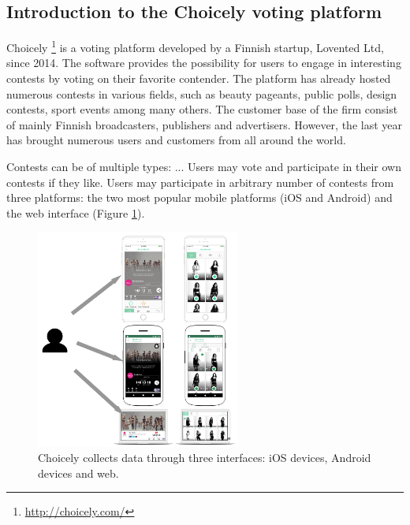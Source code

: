 \subsection{Introduction to the Choicely voting platform}
    Choicely \footnote{\url{http://choicely.com/}} is a voting platform developed by a Finnish startup, Lovented Ltd, since 2014. The software provides the possibility for users to engage in interesting contests by voting on their favorite contender. The platform has already hosted numerous contests in various fields, such as beauty pageants, public polls, design contests, sport events among many others. The customer base of the firm consist of mainly Finnish broadcasters, publishers and advertisers. However, the last year has brought numerous users and customers from all around the world.
    
    Contests can be of multiple types: ... %
    Users may vote and participate in their own contests if they like. Users may participate in arbitrary number of contests from three platforms: the two most popular mobile platforms (iOS and Android) and the web interface (Figure \ref{choicely_platforms}). 

    \begin{figure}[h] 
		\begin{center}
			\includegraphics[width=0.6\textwidth]{images/choicely_platforms.png}
			\caption{Choicely collects data through three interfaces: iOS devices, Android devices and web.}
			\label{choicely_platforms}
		\end{center}
    \end{figure}
    
